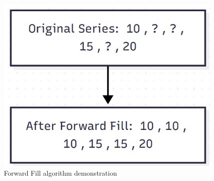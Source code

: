 \begin{figure}[htbp]
	\centering %
	\includegraphics[scale=0.4]{Chapters/images/forward_fill.jpg}
	\caption{Forward Fill algorithm demonstration}
	\label{fig:forward_fill} %
\end{figure}
